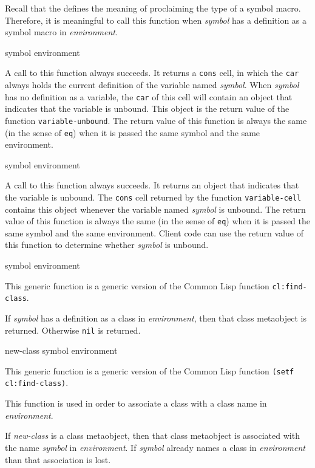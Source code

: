Recall that the \hs{} defines the meaning of proclaiming the type of a
symbol macro.  Therefore, it is meaningful to call this function when
\textit{symbol} has a definition as a symbol macro in
\textit{environment}.

 {symbol environment}

A call to this function always succeeds.  It returns a \texttt{cons}
cell, in which the \texttt{car} always holds the current definition of
the variable named \textit{symbol}.  When \textit{symbol} has no
definition as a variable, the \texttt{car} of this cell will contain
an object that indicates that the variable is unbound.  This object is
the return value of the function \texttt{variable-unbound}.  The
return value of this function is always the same (in the sense of
\texttt{eq}) when it is passed the same symbol and the same
environment.

 {symbol environment}

A call to this function always succeeds.  It returns an object that
indicates that the variable is unbound.  The \texttt{cons} cell
returned by the function \texttt{variable-cell} contains this object
whenever the variable named \textit{symbol} is unbound.  The return
value of this function is always the same (in the sense of
\texttt{eq}) when it is passed the same symbol and the same
environment.  Client code can use the return value of this function to
determine whether \textit{symbol} is unbound.

 {symbol environment}

This generic function is a generic version of the Common Lisp function
\texttt{cl:find-class}.

If \textit{symbol} has a definition as a class in
\textit{environment}, then that class metaobject is returned.
Otherwise \texttt{nil} is returned.

 {new-class symbol environment}

This generic function is a generic version of the Common Lisp function
\texttt{(setf cl:find-class)}.

This function is used in order to associate a class with a class name
in \textit{environment}.

If \textit{new-class} is a class metaobject, then that class
metaobject is associated with the name \textit{symbol} in
\textit{environment}.  If \textit{symbol} already names a class in
\textit{environment} than that association is lost.

